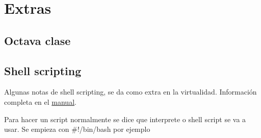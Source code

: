 \documentclass[titlepage,a4paper]{article}
\begin{document}
%
% 
%

\section{Extras}
\subsection*{Octava clase}
\subsection{Shell scripting}
Algunas notas de shell scripting, se da como extra en la virtualidad. Información completa en el
\href{https://www.gnu.org/savannah-checkouts/gnu/bash/manual/bash.html}{manual}.

Para hacer un script normalmente se dice que interprete o shell script se va a usar.
Se empieza con \#!/bin/bash por ejemplo
\end{document}
